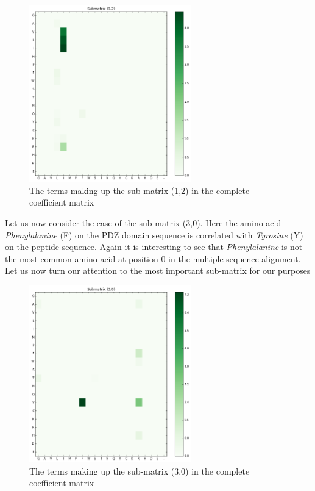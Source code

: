 \documentclass[a4paper, 12pt]{article}
\begin{document}
\begin{enumerate}
\begin{figure}[!h]
\centering
\label{submatrix_12}
\includegraphics[width=7cm]{Images/submatrix_12.png}
\caption{The terms making up the sub-matrix (1,2) in the complete coefficient matrix}
\end{figure}

Let us now consider the case of the sub-matrix (3,0). Here the amino acid \emph{Phenylalanine} (F) on the PDZ domain sequence is correlated with \emph{Tyrosine} (Y) on the peptide sequence. Again it is interesting to see that \emph{Phenylalanine} is not the most common amino acid at position 0 in the multiple sequence alignment. Let us now turn our attention to the most important sub-matrix for our purposes

\begin{figure}[!h]
\centering
\label{submatrix_30}
\includegraphics[width=7cm]{Images/submatrix_30.png}
\caption{The terms making up the sub-matrix (3,0) in the complete coefficient matrix}
\end{figure}


\end{enumerate}
\end{document}

